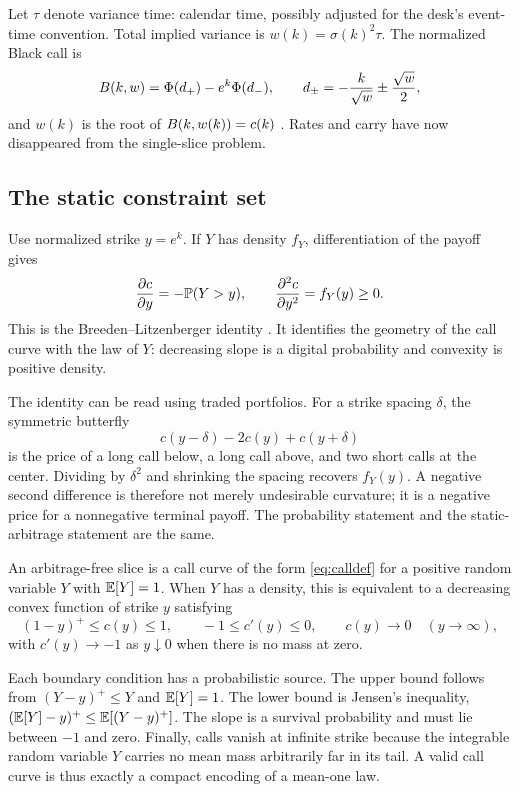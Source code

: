 Let $\tau$ denote variance time: calendar time, possibly adjusted for the
desk's event-time convention.  Total implied variance is
$w(k)=\sigma(k)^2\tau$.  The normalized Black call is
\begin{equation}
B(k,w)=\Phi(d_+)-e^k\Phi(d_-),
\qquad d_\pm=-\frac{k}{\sqrt w}\pm\frac{\sqrt w}{2},
\label{eq:black}
\end{equation}
and $w(k)$ is the root of $B(k,w(k))=c(k)$
\citep{Black1976}.  Rates and carry have now disappeared from the single-slice
problem.

\subsection{The static constraint set}

Use normalized strike $y=e^k$.  If $Y$ has density $f_Y$, differentiation of
the payoff gives
\begin{equation}
\frac{\partial c}{\partial y}=-\mathbb{P}(Y>y),
\qquad
\frac{\partial^2c}{\partial y^2}=f_Y(y)\ge0.
\label{eq:BL}
\end{equation}
This is the Breeden--Litzenberger identity
\citep{BreedenLitzenberger1978}.  It identifies the geometry of the call curve
with the law of $Y$: decreasing slope is a digital probability and convexity
is positive density.

The identity can be read using traded portfolios.  For a strike spacing
$\delta$, the symmetric butterfly
\[
c(y-\delta)-2c(y)+c(y+\delta)
\]
is the price of a long call below, a long call above, and two short calls at
the center.  Dividing by $\delta^2$ and shrinking the spacing recovers
$f_Y(y)$.  A negative second difference is therefore not merely undesirable
curvature; it is a negative price for a nonnegative terminal payoff.  The
probability statement and the static-arbitrage statement are the same.

\begin{definition}
\label{def:slice}
An arbitrage-free slice is a call curve of the form \eqref{eq:calldef} for a
positive random variable $Y$ with $\mathbb{E}[Y]=1$.  When $Y$ has a density, this is
equivalent to a decreasing convex function of strike $y$ satisfying
\[
(1-y)^+\le c(y)\le1,\qquad -1\le c'(y)\le0,\qquad
c(y)\longrightarrow0\quad(y\to\infty),
\]
with $c'(y)\to-1$ as $y\downarrow0$ when there is no mass at zero.
\end{definition}

Each boundary condition has a probabilistic source.  The upper bound follows
from $(Y-y)^+\le Y$ and $\mathbb{E}[Y]=1$.  The lower bound is Jensen's inequality,
$(\mathbb{E}[Y]-y)^+\le\mathbb{E}[(Y-y)^+]$.  The slope is a survival probability and must
lie between $-1$ and zero.  Finally, calls vanish at infinite strike because
the integrable random variable $Y$ carries no mean mass arbitrarily far in
its tail.  A valid call curve is thus exactly a compact encoding of a
mean-one law.

